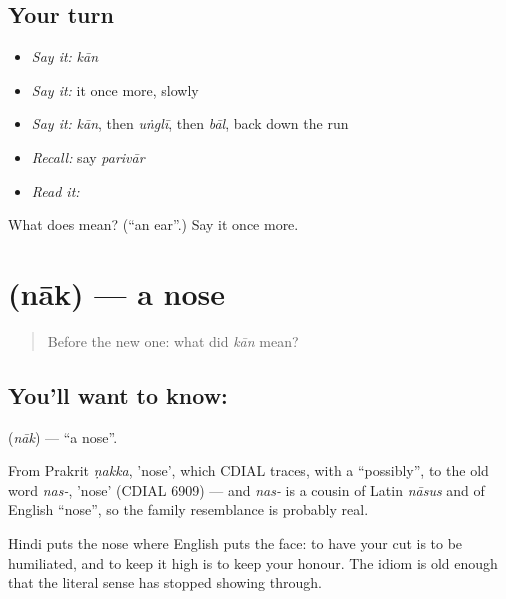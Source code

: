 \subsection*{Your turn}
\begin{itemize}
\raggedright
  \item \emph{Say it:} \emph{kān}
  \item \emph{Say it:} it once more, slowly
  \item \emph{Say it:} \emph{kān}, then \emph{uṅglī}, then \emph{bāl}, back down the run
  \item \emph{Recall:} say \emph{parivār}
  \item \emph{Read it:} \textbf{}
\end{itemize}

\begin{tcolorbox}[breakable,colback=teal!4,colframe=teal!35!black,title={Before you move on}]
What does  mean? (\textquotedblleft{}an ear\textquotedblright{}.) Say it once more.
\end{tcolorbox}
\section[\texorpdfstring{\hi{नाक} (nāk)}{नाक (nāk)}]{ (nāk) — a nose}

\label{lesson:HI-C46-nose}



\begin{quote}
Before the new one: what did \emph{kān} mean?
\end{quote}

\subsection*{You'll want to know: }
\textbf{} (\emph{nāk}) — \textquotedblleft{}a nose\textquotedblright{}.

From Prakrit \emph{ṇakka}, 'nose', which CDIAL traces, with a \textquotedblleft{}possibly\textquotedblright{}, to the old word \emph{nas-}, 'nose' (CDIAL 6909) — and \emph{nas-} is a cousin of Latin \emph{nāsus} and of English \textquotedblleft{}nose\textquotedblright{}, so the family resemblance is probably real.

Hindi puts the nose where English puts the face: to have your  cut is to be humiliated, and to keep it high is to keep your honour. The idiom is old enough that the literal sense has stopped showing through.


